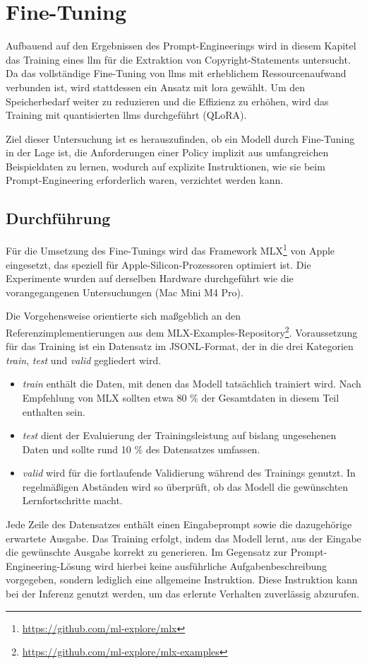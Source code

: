\chapter{Fine-Tuning}\label{ch:fine-tuning}

Aufbauend auf den Ergebnissen des Prompt-Engineerings wird in diesem Kapitel das Training eines \gls{llm} für die Extraktion von Copyright-Statements untersucht.
Da das vollständige Fine-Tuning von \glspl{llm} mit erheblichem Ressourcenaufwand verbunden ist, wird stattdessen ein Ansatz mit \gls{lora} gewählt.
Um den Speicherbedarf weiter zu reduzieren und die Effizienz zu erhöhen, wird das Training mit quantisierten \glspl{llm} durchgeführt (QLoRA).

Ziel dieser Untersuchung ist es herauszufinden, ob ein Modell durch Fine-Tuning in der Lage ist, die Anforderungen einer Policy implizit aus umfangreichen Beispieldaten zu lernen, wodurch auf explizite Instruktionen, wie sie beim Prompt-Engineering erforderlich waren, verzichtet werden kann.

\section{Durchführung}

Für die Umsetzung des Fine-Tunings wird das Framework MLX\footnote{\url{https://github.com/ml-explore/mlx}} von Apple eingesetzt, das speziell für Apple-Silicon-Prozessoren optimiert ist.
Die Experimente wurden auf derselben Hardware durchgeführt wie die vorangegangenen Untersuchungen (Mac Mini M4 Pro).

Die Vorgehensweise orientierte sich maßgeblich an den Referenzimplementierungen aus dem MLX-Examples-Repository\footnote{\url{https://github.com/ml-explore/mlx-examples}}.
Voraussetzung für das Training ist ein Datensatz im JSONL-Format, der in die drei Kategorien \textit{train}, \textit{test} und \textit{valid} gegliedert wird.

\begin{itemize}
    \item \textit{train} enthält die Daten, mit denen das Modell tatsächlich trainiert wird. Nach Empfehlung von MLX sollten etwa \num{80} \% der Gesamtdaten in diesem Teil enthalten sein.
    \item \textit{test} dient der Evaluierung der Trainingsleistung auf bislang ungesehenen Daten und sollte rund \num{10} \% des Datensatzes umfassen.
    \item \textit{valid} wird für die fortlaufende Validierung während des Trainings genutzt. In regelmäßigen Abständen wird so überprüft, ob das Modell die gewünschten Lernfortschritte macht.
\end{itemize}
Jede Zeile des Datensatzes enthält einen Eingabeprompt sowie die dazugehörige erwartete Ausgabe.
Das Training erfolgt, indem das Modell lernt, aus der Eingabe die gewünschte Ausgabe korrekt zu generieren.
Im Gegensatz zur Prompt-Engineering-Lösung wird hierbei keine ausführliche Aufgabenbeschreibung vorgegeben, sondern lediglich eine allgemeine Instruktion.
Diese Instruktion kann bei der Inferenz genutzt werden, um das erlernte Verhalten zuverlässig abzurufen.

